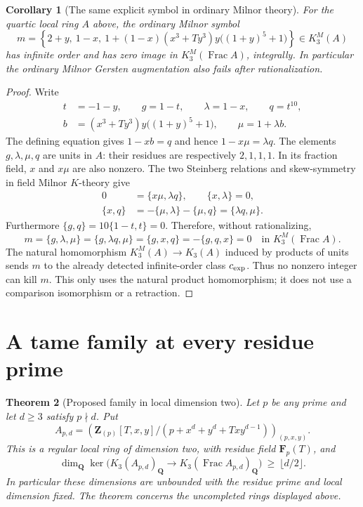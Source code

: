 \documentclass[11pt,a4paper]{article}
\newtheorem{theorem}{Theorem}[section]
\newtheorem{corollary}[theorem]{Corollary}
\theoremstyle{remark}
\newcommand{\Z}{\mathbf Z}
\newcommand{\Q}{\mathbf Q}
\newcommand{\F}{\mathbf F}
\newcommand{\Frac}{\operatorname{Frac}}
\begin{document}

\begin{corollary}[The same explicit symbol in ordinary Milnor theory]
\label{cor:twodimexplicitMilnor}
For the quartic local ring $A$ above, the ordinary Milnor symbol
\[
 m=\left\{2+y,\ 1-x,\
 1+(1-x)(x^3+Ty^3)y\bigl((1+y)^5+1\bigr)\right\}
       \in K_3^M(A)
\]
has infinite order and has zero image in
$K_3^M(\Frac A)$, integrally. In particular the ordinary
Milnor Gersten augmentation also fails after rationalization.
\end{corollary}

\begin{proof}
Write
\begin{align*}
 t&=-1-y,\qquad g=1-t,\qquad \lambda=1-x,\qquad q=t^{10},\\
 b&=(x^3+Ty^3)y\bigl((1+y)^5+1\bigr),\qquad \mu=1+\lambda b.
\end{align*}
The defining equation gives $1-xb=q$ and hence
$1-x\mu=\lambda q$. The elements $g,\lambda,\mu,q$
are units in $A$: their residues are respectively $2,1,1,1$.
In its fraction field, $x$ and $x\mu$ are also nonzero.
The two Steinberg relations and skew-symmetry in field
Milnor $K$-theory give
\begin{align*}
 0&=\{x\mu,\lambda q\},\qquad \{x,\lambda\}=0,\\
 \{x,q\}&=-\{\mu,\lambda\}-\{\mu,q\}
            =\{\lambda q,\mu\}.
\end{align*}
Furthermore $\{g,q\}=10\{1-t,t\}=0$. Therefore, without
rationalizing,
\[
 m=\{g,\lambda,\mu\}
   =\{g,\lambda q,\mu\}
   =\{g,x,q\}
   =-\{g,q,x\}=0
       \quad\text{in }K_3^M(\Frac A).
\]
The natural homomorphism $K_3^M(A)\to K_3(A)$ induced
by products of units sends $m$ to the already detected
infinite-order class $c_{\rm exp}$. Thus no nonzero integer
can kill $m$. This only uses the natural product homomorphism;
it does not use a comparison isomorphism or a retraction.
\end{proof}

\section{A tame family at every residue prime}
\label{sec:twodimtamefamily}

\begin{theorem}[Proposed family in local dimension two]
\label{thm:twodimtamefamily}
Let $p$ be any prime and let $d\ge3$ satisfy $p\nmid d$. Put
\[
 A_{p,d}=\left(\Z_{(p)}[T,x,y]/
       (p+x^d+y^d+Txy^{d-1})\right)_{(p,x,y)}.
\]
This is a regular local ring of dimension two, with residue field
$\F_p(T)$, and
\[
 \dim_{\Q}\ker\bigl(K_3(A_{p,d})_{\Q}
       \longrightarrow K_3(\Frac A_{p,d})_{\Q}\bigr)
       \ \ge\ \lfloor d/2\rfloor.
\]
In particular these dimensions are unbounded with the residue
prime and local dimension fixed. The theorem concerns the
uncompleted rings displayed above.
\end{theorem}
\end{document}
